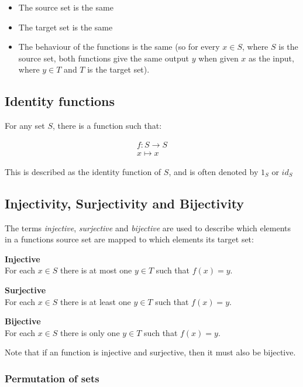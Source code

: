 \begin{itemize}
	\item The source set is the same
	\item The target set is the same
	\item The behaviour of the functions is the same (so for every $x \in S$, 
		  where $S$ is the source set, both functions give the same output $y$
		  when given $x$ as the input, where $y \in T$ and $T$ is the target
		  set).
\end{itemize}

\subsection{Identity functions}

For any set $S$, there is a function such that:

\[
	\begin{split}
	f:S \rightarrow S\\
	x \longmapsto x
	\end{split}
\]	

This is described as the identity function of $S$, and is often denoted by $1_S$
or $id_S$

\subsection{Injectivity, Surjectivity and Bijectivity}

The terms {\it injective}, {\it surjective} and {\it bijective} are used to
describe which elements in a functions source set are mapped to which elements
its target set:

\begin{description}
	\item {\bf Injective}\\
		For each $x \in S$ there is at most one $y \in T$ such that $f(x) = y$.
	\item {\bf Surjective}\\
		For each $x \in S$ there is at least one $y \in T$ such that $f(x) = y$.
	\item {\bf Bijective}\\
		For each $x \in S$ there is only one $y \in T$ such that $f(x) = y$.
\end{description}

Note that if an function is injective and surjective, then it must also be
bijective.

\subsubsection{Permutation of sets}

